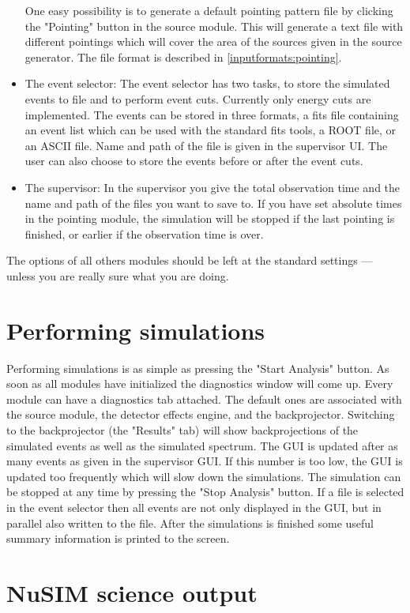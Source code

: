 \begin{itemize}
One easy possibility is to generate a default pointing pattern file by clicking the "Pointing" button in the source module. 
This will generate a text file with different pointings which will cover the area of the sources given in the source generator. The file format is described in \ref{inputformats:pointing}.
\item The event selector:
The event selector has two tasks, to store the simulated events to file and to perform event cuts.
Currently only energy cuts are implemented.
The events can be stored in three formats, a fits file containing an event list which can be used with the standard fits tools, a ROOT file, or an ASCII file. Name and path of the file is given in the supervisor UI.
The user can also choose to store the events before or after the event cuts.
\item The supervisor:
In the supervisor you give the total observation time and the name and path of the files you want to save to.
If you have set absolute times in the pointing module, the simulation will be stopped if the last pointing is finished, or earlier if the observation time is over. 
\end{itemize}
The options of all others modules should be left at the standard settings --- unless you are really sure what you are doing.


\section{Performing simulations}

Performing simulations is as simple as pressing the "Start Analysis" button. 
As soon as all modules have initialized the diagnostics window will come up. 
Every module can have a diagnostics tab attached. 
The default ones are associated with the source module, the detector effects engine, and the backprojector.
Switching to the backprojector (the "Results" tab) will show backprojections of the simulated events as well as the simulated spectrum.
The GUI is updated after as many events as given in the supervisor GUI.
If this number is too low, the GUI is updated too frequently which will slow down the simulations.
The simulation can be stopped at any time by pressing the "Stop Analysis" button.
If a file is selected in the event selector then all events are not only displayed in the GUI, but in parallel also written to the file.
After the simulations is finished some useful summary information is printed to the screen.

\section{NuSIM science output}

